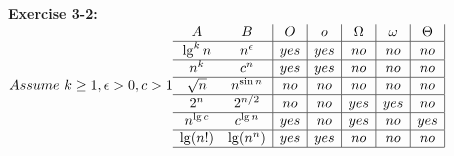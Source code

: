 \documentclass{article}
\begin{document}
\begin{spacing}{2.0}
\noindent
\textbf{Exercise 3-2:}\\
$
Assume\ k \ge 1, \epsilon > 0, c > 1\\
\begin{array}{cc|c|c|c|c|c|}
A & B & O & o & \Omega & \omega & \Theta\\
\hline
\lg ^ kn & n ^ \epsilon & yes & yes & no & no & no\\
\hline
n ^ k & c ^ n & yes & yes & no & no & no\\
\hline
\sqrt n & n ^ {\sin n} & no & no & no & no & no\\
\hline
2 ^ n & 2 ^ {n / 2} & no & no & yes & yes & no\\
\hline
n ^ {\lg c} & c ^ {\lg n} & yes & no & yes & no & yes\\
\hline
\lg (n!) & \lg (n ^ n) & yes & yes & no & no & no\\
\hline
\end{array}\\
$
\end{spacing}
\end{document}
